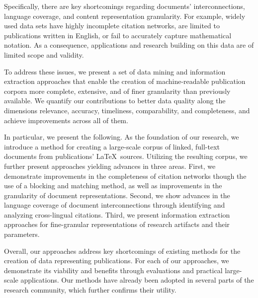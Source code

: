 


Specifically, there are key shortcomings regarding documents' interconnections, language coverage, and content representation granularity.
For example, widely used data sets have highly incomplete citation networks, are limited to publications written in English, or fail to accurately capture mathematical notation. As a consequence, applications and research building on this data are of limited scope and validity.

To address these issues, we present a set of data mining and information extraction approaches that enable the creation of machine-readable publication corpora more complete, extensive, and of finer granularity than previously available.
We quantify our contributions to better data quality along the dimensions relevance, accuracy, timeliness, comparability, and completeness, and achieve improvements across all of them.

In particular, we present the following.
As the foundation of our research, we introduce a method for creating a large-scale corpus of linked, full-text documents from publications' \LaTeX\ sources.
Utilizing the resulting corpus, we further present approaches yielding advances in three areas.
First, we demonstrate improvements in the completeness of citation networks though the use of a blocking and matching method, as well as improvements in the granularity of document representations.
Second, we show advances in the language coverage of document interconnections through identifying and analyzing cross-lingual citations.
Third, we present information extraction approaches for fine-granular representations of research artifacts and their parameters.

Overall, our approaches address key shortcomings of existing methods for the creation of data representing publications.
For each of our approaches, we demonstrate its viability and benefits through evaluations and practical large-scale applications.
Our methods have already been adopted in several parts of the research community, which further confirms their utility.
